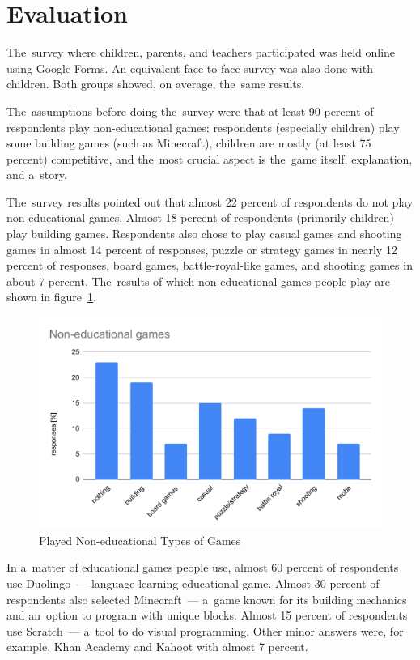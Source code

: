 \section{Evaluation}

The~survey where children, parents, and teachers participated was held online using Google Forms.
An equivalent face-to-face survey was also done with children.
Both groups showed, on average, the~same results.

The~assumptions before doing the~survey were that at least 90 percent of respondents play non-educational games;
respondents (especially children) play some building games (such as Minecraft), children are mostly (at least 75 percent) competitive, and the~most crucial aspect is the~game itself, explanation, and a~story.

The~survey results pointed out that almost 22 percent of respondents do not play non-educational games.
Almost 18 percent of respondents (primarily children) play building games.
Respondents also chose to play casual games and shooting games in almost 14 percent of responses, puzzle or strategy games in nearly 12 percent of responses, board games, battle-royal-like games, and shooting games in about 7 percent.
The~results of which non-educational games people play are shown in figure~\ref{fig:survey:games}.

\begin{figure}
    \centering
    \includegraphics[width=1\linewidth]{assets/survey/non-educational-games.pdf}
    \caption{Played Non-educational Types of Games}
    \label{fig:survey:games}
\end{figure}

In a~matter of educational games people use, almost 60 percent of respondents use Duolingo~--- language learning educational game.
Almost 30 percent of respondents also selected Minecraft~--- a~game known for its building \mbox{mechanics} and an~option to program with unique blocks.
Almost 15 percent of respondents use Scratch~--- a~tool to do visual programming.
Other minor answers were, for example, Khan Academy and Kahoot with almost 7 percent.  

